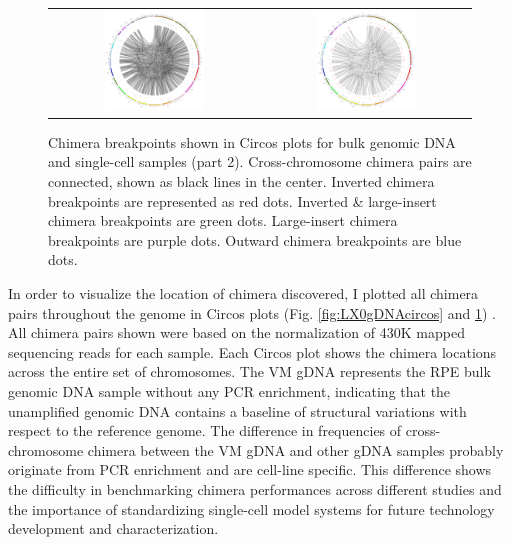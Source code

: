 \begin{figure}
\begin{tabular}{cc}
\includegraphics[keepaspectratio,width=0.5\textwidth]{./figures/circos/SRR5365000gDNA_0529} & \includegraphics[keepaspectratio,width=0.5\textwidth]{./figures/circos/SRR5365374_0529} \\
\end{tabular}
\caption[Chimera breakpoints shown in Circos plots (part 2)]{Chimera breakpoints shown in Circos plots for bulk genomic DNA and single-cell samples (part 2). Cross-chromosome chimera pairs are connected, shown as black lines in the center. Inverted chimera breakpoints are represented as red dots. Inverted \& large-insert chimera breakpoints are green dots. Large-insert chimera breakpoints are purple dots. Outward chimera breakpoints are blue dots.}
\label{fig:part2_LX0gDNAcircos}
\end{figure}


In order to visualize the location of chimera discovered, I plotted all chimera pairs throughout the genome in Circos plots (Fig. \ref{fig:LX0gDNAcircos} and \ref{fig:part2_LX0gDNAcircos}) \cite{Krzywinski:2009ix}. All chimera pairs shown were based on the normalization of 430K mapped sequencing reads for each sample. Each Circos plot shows the chimera locations across the entire set of chromosomes. The VM gDNA represents the RPE bulk genomic DNA sample without any PCR enrichment, indicating that the unamplified genomic DNA contains a baseline of structural variations with respect to the reference genome. The difference in frequencies of cross-chromosome chimera between the VM gDNA and other gDNA samples probably originate from PCR enrichment and are cell-line specific. This difference shows the difficulty in benchmarking chimera performances across different studies and the importance of standardizing single-cell model systems for future technology development and characterization. 


